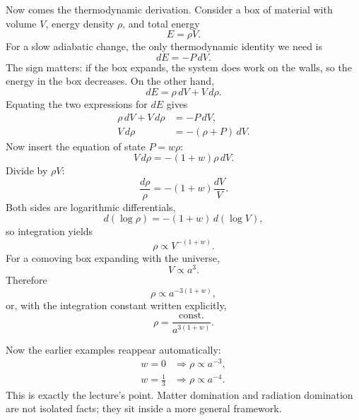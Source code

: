 Now comes the thermodynamic derivation. Consider a box of material with volume \(V\), energy density \(\rho\), and total energy
\begin{equation}
E=\rho V .
\end{equation}
For a slow adiabatic change, the only thermodynamic identity we need is
\begin{equation}
dE=-P\,dV .
\end{equation}
The sign matters: if the box expands, the system does work on the walls, so the energy in the box decreases. On the other hand,
\begin{equation}
dE=\rho\,dV+V\,d\rho .
\end{equation}
Equating the two expressions for \(dE\) gives
\begin{align}
\rho\,dV+V\,d\rho &= -P\,dV, \\
V\,d\rho &= -(\rho+P)\,dV .
\end{align}
Now insert the equation of state \(P=w\rho\):
\begin{equation}
V\,d\rho=-(1+w)\rho\,dV .
\end{equation}
Divide by \(\rho V\):
\begin{equation}
\frac{d\rho}{\rho}=-(1+w)\frac{dV}{V} .
\end{equation}
Both sides are logarithmic differentials,
\begin{equation}
d(\log\rho)=-(1+w)\,d(\log V) ,
\end{equation}
so integration yields
\begin{equation}
\rho\propto V^{-(1+w)} .
\end{equation}
For a comoving box expanding with the universe,
\begin{equation}
V\propto a^{3} .
\end{equation}
Therefore
\begin{equation}
\rho\propto a^{-3(1+w)},
\end{equation}
or, with the integration constant written explicitly,
\begin{equation}
\rho=\frac{\text{const.}}{a^{3(1+w)}} .
\end{equation}

Now the earlier examples reappear automatically:
\begin{align}
w=0 &\Longrightarrow \rho\propto a^{-3}, \\
w=\frac13 &\Longrightarrow \rho\propto a^{-4}.
\end{align}
This is exactly the lecture's point. Matter domination and radiation domination are not isolated facts; they sit inside a more general framework.

